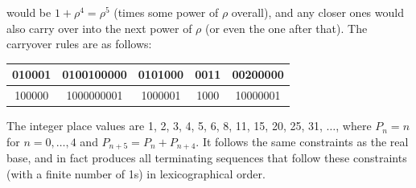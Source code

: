 \documentclass{article}
\begin{document}
would be $1+\rho^4=\rho^5$ (times some power of $\rho$ overall),
and any closer ones would also carry over into the next power of $\rho$
(or even the one after that).
The carryover rules are as follows:
\begin{center}
  \begin{tabular}{|c|c|c|c|c|}
    \hline
    010001 & 0100100000 & 0101000 & 0011 & 00200000 \\ \hline
    100000 & 1000000001 & 1000001 & 1000 & 10000001 \\ \hline  
  \end{tabular}
\end{center}
The integer place values are 1, 2, 3, 4, 5, 6, 8, 11, 15, 20, 25, 31, $\ldots$,
where $P_n=n$ for $n=0, \ldots, 4$ and $P_{n+5}=P_n+P_{n+4}$.
It follows the same constraints as the real base,
and in fact produces all terminating sequences that follow these constraints
(with a finite number of 1s) in lexicographical order.
\end{document}
